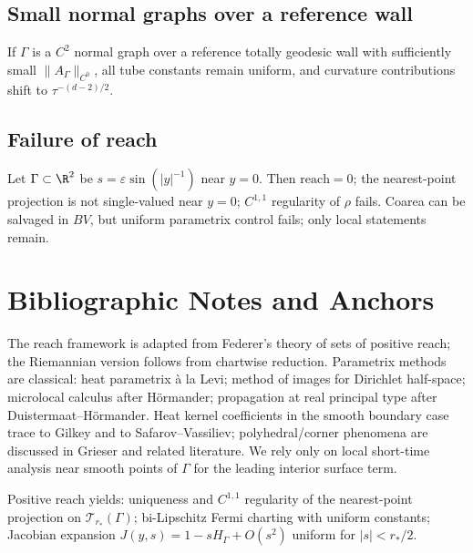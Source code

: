 \subsection{Small normal graphs over a reference wall}
If $\Gamma$ is a $C^2$ normal graph over a reference totally geodesic wall with sufficiently small $\|A_\Gamma\|_{C^0}$, all tube constants remain uniform, and curvature contributions shift to $\tau^{-(d-2)/2}$.

\subsection{Failure of reach}
Let $\Gamma\subset\R^2$ be $s=\varepsilon \sin(|y|^{-1})$ near $y=0$. Then $\mathrm{reach}=0$; the nearest-point projection is not single-valued near $y=0$; $C^{1,1}$ regularity of $\rho$ fails. Coarea can be salvaged in $BV$, but uniform parametrix control fails; only local statements remain.

\section*{Bibliographic Notes and Anchors}
The reach framework is adapted from Federer’s theory of sets of positive reach; the Riemannian version follows from chartwise reduction. 
Parametrix methods are classical: heat parametrix à la Levi; method of images for Dirichlet half-space; microlocal calculus after Hörmander; propagation at real principal type after Duistermaat–Hörmander. 
Heat kernel coefficients in the smooth boundary case trace to Gilkey and to Safarov–Vassiliev; polyhedral/corner phenomena are discussed in Grieser and related literature. 
We rely only on local short-time analysis near smooth points of $\Gamma$ for the leading interior surface term.

\begin{remark}
Positive reach yields: uniqueness and $C^{1,1}$ regularity of the nearest-point projection on $\mathcal T_{r_*}(\Gamma)$; bi-Lipschitz Fermi charting with uniform constants; Jacobian expansion $J(y,s)=1-sH_\Gamma+O(s^2)$ uniform for $|s|<r_*/2$.
\end{remark}

